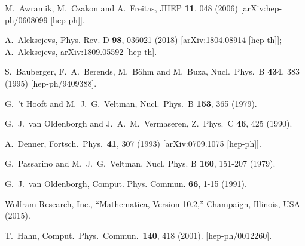 \documentclass[12pt]{article}
\begin{document}
\begin{thebibliography}{99}
M.~Awramik, M.~Czakon and A.~Freitas,
JHEP \textbf{11}, 048 (2006)
[arXiv:hep-ph/0608099 [hep-ph]].

A.~Aleksejevs,
Phys. Rev. D \textbf{98}, 036021 (2018)
[arXiv:1804.08914 [hep-th]];
A.~Aleksejevs,
arXiv:1809.05592 [hep-th].

S.~Bauberger, F.~A.~Berends, M.~B\"ohm and M.~Buza,
Nucl.\ Phys.\ B {\bf 434}, 383 (1995)
[hep-ph/9409388].

  G.~'t Hooft and M.~J.~G.~Veltman,
  Nucl.\ Phys.\ B {\bf 153}, 365 (1979).

  G.~J.~van Oldenborgh and J.~A.~M.~Vermaseren,
  Z.\ Phys.\ C {\bf 46}, 425 (1990).

  A.~Denner,
  Fortsch.\ Phys.\  {\bf 41}, 307 (1993)
  [arXiv:0709.1075 [hep-ph]].

G.~Passarino and M.~J.~G.~Veltman,
Nucl. Phys. B \textbf{160}, 151-207 (1979).

G.~J.~van Oldenborgh,
Comput. Phys. Commun. \textbf{66}, 1-15 (1991).

Wolfram Research, Inc., ``Mathematica, Version 10.2,''
Champaign, Illinois, USA (2015).

  T.~Hahn,
  Comput.\ Phys.\ Commun.\  {\bf 140}, 418 (2001).
  [hep-ph/0012260].


\end{thebibliography}
\end{document}
